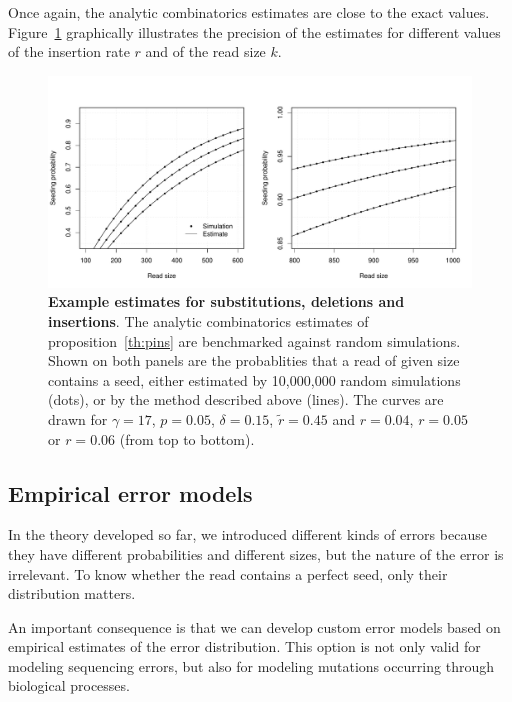 \documentclass{article}
\begin{document}
Once again, the analytic combinatorics estimates are close to the exact
values. Figure~\ref{fig:simulpins} graphically illustrates the precision
of the estimates for different values of the insertion rate $r$ and
of the read size $k$.

\begin{figure}[h]
\centering
\includegraphics[scale=0.445]{simulpins.pdf}
\caption{\textbf{Example estimates for substitutions, deletions and
insertions}. The analytic combinatorics estimates of
proposition~\ref{th:pins} are benchmarked against random simulations.
Shown on both panels are the probablities that a read of given size
contains a seed, either estimated by 10,000,000 random simulations (dots),
or by the method described above (lines). The curves are drawn for
$\gamma=17$, $p=0.05$, $\delta=0.15$, $\tilde{r} = 0.45$ and $r=0.04$,
$r=0.05$ or $r=0.06$ (from top to bottom).}
\label{fig:simulpins}
\end{figure}





\subsection{Empirical error models}
\label{subsec:empirical}

In the theory developed so far, we introduced different kinds of errors
because they have different probabilities and different sizes, but the
nature of the error is irrelevant. To know whether the read contains a
perfect seed, only their distribution matters.

An important consequence is that we can develop custom error models based
on empirical estimates of the error distribution. This option is not only
valid for modeling sequencing errors, but also for modeling mutations
occurring through biological processes.
\end{document}
